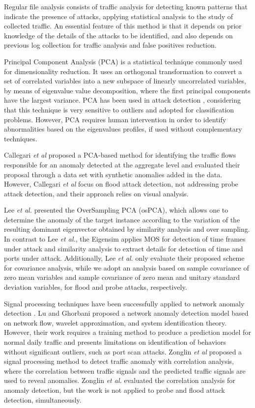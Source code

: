 Regular file analysis \cite{raynal2004honeypot} consists of traffic analysis for detecting known patterns that indicate the presence of attacks, applying statistical analysis to the study of collected traffic. An essential feature of this method is that it depends on prior knowledge of the details of the attacks to be identified, and also depends on previous log collection for traffic analysis and false positives reduction.

Principal Component Analysis (PCA) is a statistical technique commonly used for dimensionality reduction. It uses an orthogonal transformation to convert a set of correlated variables into a new subspace of linearly uncorrelated variables, by means of eigenvalue value decomposition, where the first principal components have the largest variance. PCA has been used in attack detection \cite{almotairi2009technique}, considering that this technique is very sensitive to outliers and adopted for classification problems. However, PCA requires human intervention in order to identify abnormalities based on the eigenvalues profiles, if used without complementary techniques.

Callegari \emph{et al} \cite{Zonglin2009} proposed a PCA-based method for identifying the traffic flows responsible for an anomaly detected at the aggregate level and evaluated their proposal through a data set with synthetic anomalies added in the data. However, Callegari \emph{et al} focus on flood attack detection, not addressing probe attack detection, and their approach relies on visual analysis. 

Lee \emph{et al.} \cite{Lee2013} presented the OverSampling PCA (osPCA), which allows one to determine the anomaly of the target instance according to the variation of the resulting dominant eigenvector obtained by similarity analysis and over sampling. In contrast to Lee \emph{et al.}, the Eigensim applies MOS for detection of time frames under attack and similarity analysis to extract details for detection of time and ports under attack. Additionally, Lee \emph{et al.} only evaluate their proposed scheme for covariance analysis, while we adopt an analysis based on sample covariance of zero mean variables and sample covariance of zero mean and unitary standard deviation variables, for flood and probe attacks, respectively. 

Signal processing techniques have been successfully applied to network anomaly detection \cite{Lu2009}. Lu and Ghorbani \cite{Lu2009} proposed a network anomaly detection model based on network flow, wavelet approximation, and system identification theory. However, their work requires a training method to produce a prediction model for normal daily traffic and presents limitations on identification of behaviors without significant outliers, such as port scan attacks. Zonglin \emph{et al} \cite{Zonglin2009} proposed a signal processing method to detect traffic anomaly with correlation analysis, where the correlation between traffic signals and the predicted traffic signals are used to reveal anomalies. Zonglin \emph{et al.} \cite{Zonglin2009} evaluated the correlation analysis for anomaly detection, but the work is not applied to probe and flood attack detection, simultaneously.

